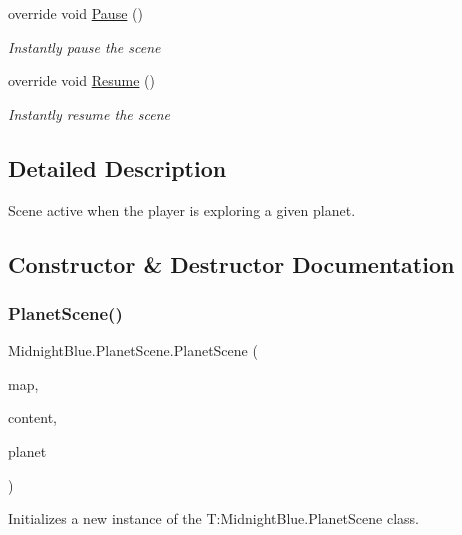 \begin{DoxyCompactItemize}
override void \hyperlink{class_midnight_blue_1_1_planet_scene_abc077e1cd5f40879ca3af4224f0ff455}{Pause} ()
\begin{DoxyCompactList}\small\item\em Instantly pause the scene \end{DoxyCompactList}\item 
override void \hyperlink{class_midnight_blue_1_1_planet_scene_aa14750d3675b59462796e821b3921397}{Resume} ()
\begin{DoxyCompactList}\small\item\em Instantly resume the scene \end{DoxyCompactList}\end{DoxyCompactItemize}


\subsection{Detailed Description}
Scene active when the player is exploring a given planet. 



\subsection{Constructor \& Destructor Documentation}
\hypertarget{class_midnight_blue_1_1_planet_scene_a50ee691836116a89ff549e519f895ba3}{}\label{class_midnight_blue_1_1_planet_scene_a50ee691836116a89ff549e519f895ba3} 
\subsubsection{\texorpdfstring{Planet\+Scene()}{PlanetScene()}}
{\footnotesize\ttfamily Midnight\+Blue.\+Planet\+Scene.\+Planet\+Scene (\begin{DoxyParamCaption}\item[{Entity\+Map}]{map,  }\item[{Content\+Manager}]{content,  }\item[{\hyperlink{class_midnight_blue_1_1_planet}{Planet}}]{planet }\end{DoxyParamCaption})\hspace{0.3cm}{\ttfamily [inline]}}



Initializes a new instance of the T\+:\+Midnight\+Blue.\+Planet\+Scene class. 


